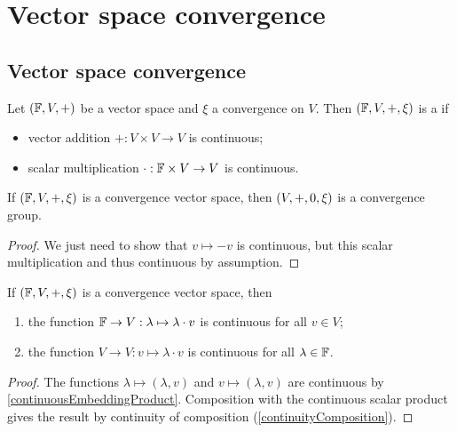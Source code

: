 \chapter{Vector space convergence}

\section{Vector space convergence}
\begin{definition}
Let $\left( \mathbb{F},V,+ \right)$ be a vector space and $\xi$ a convergence on $V$. Then $\left( \mathbb{F},V,+, \xi \right)$ is a  if
\begin{itemize}
\item vector addition $+: V\times V \to V$ is continuous;
\item scalar multiplication $\cdot: \mathbb{F}\times V \to V$ is continuous.
\end{itemize}
\end{definition}

\begin{lemma}
If $\left( \mathbb{F},V,+, \xi \right)$ is a convergence vector space, then $\left( V,+, 0, \xi \right)$ is a convergence group.
\end{lemma}
\begin{proof}
We just need to show that $v\mapsto -v$ is continuous, but this scalar multiplication and thus continuous by assumption.
\end{proof}

\begin{lemma} \label{continuityLemmaVectorConvergence}
If $\left( \mathbb{F},V,+, \xi \right)$ is a convergence vector space, then
\begin{enumerate}
\item the function $\mathbb{F} \to V: \lambda \mapsto \lambda\cdot v$ is continuous for all $v\in V$;
\item the function $V \to V: v \mapsto \lambda\cdot v$ is continuous for all $\lambda\in \mathbb{F}$.
\end{enumerate}
\end{lemma}
\begin{proof}
The functions $\lambda \mapsto (\lambda, v)$ and $v \mapsto (\lambda, v)$ are continuous by \ref{continuousEmbeddingProduct}. Composition with the continuous scalar product gives the result by continuity of composition (\ref{continuityComposition}).
\end{proof}

